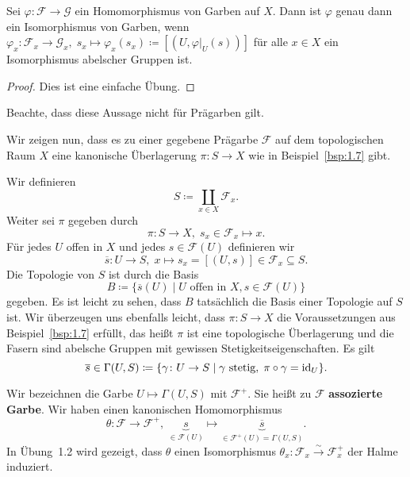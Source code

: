 \begin{prop}
	Sei $\varphi \colon \mathcal{F} \to \mathcal{G}$ ein Homomorphismus von Garben auf $X$. Dann ist $\varphi$ genau dann ein Isomorphismus von Garben, wenn $\varphi_x \colon \mathcal{F}_x \to \mathcal{G}_x,\; s_x \mapsto \varphi_x(s_x) \coloneqq [(U,\varphi\vert_U(s))]$ für alle $x \in X$ ein Isomorphismus abelscher Gruppen ist.
	\begin{proof}
		Dies ist eine einfache Übung.
	\end{proof}
	Beachte, dass diese Aussage nicht für Prägarben gilt.
\end{prop}

\begin{bem}
\label{bem:1.15}
	Wir zeigen nun, dass es zu einer gegebene Prägarbe $\mathcal{F}$ auf dem topologischen Raum $X$ eine kanonische Überlagerung $\pi\colon S \to X$ wie in Beispiel~\ref{bsp:1.7} gibt.

	Wir definieren
	\[
		S\coloneqq \coprod_{x\in X} \mathcal{F}_x.
	\]
	Weiter sei $\pi$ gegeben durch
	\[
		\pi\colon S \to X,\; s_x\in \mathcal{F}_x \mapsto x.
	\]
	Für jedes $U$ offen in $X$ und jedes $s \in \mathcal{F}(U)$ definieren wir
	\[
		\overline{s}\colon U \to S,\; x \mapsto s_x = [(U,s)] \in \mathcal{F}_x \subseteq S.
	\]
	Die Topologie von $S$ ist durch die Basis
	\[
		B \coloneqq \{\overline{s}(U) \mid U \text{ offen in } X, s \in \mathcal{F}(U)\}
	\]
	gegeben. Es ist leicht zu sehen, dass $B$ tatsächlich die Basis einer Topologie auf $S$ ist. Wir überzeugen uns ebenfalls leicht, dass $\pi\colon S \to X$ die Voraussetzungen aus Beispiel~\ref{bsp:1.7} erfüllt, das heißt $\pi$ ist eine topologische Überlagerung und die Fasern sind abelsche Gruppen mit gewissen Stetigkeitseigenschaften. Es gilt
	\[
		\overline{s} \in \Gamma(U,S) \coloneqq \{\gamma\colon U \to S \mid \gamma \text{ stetig},\; \pi \circ \gamma = \operatorname{id}_U\}.
	\]
\end{bem}

\begin{defn}
	Wir bezeichnen die Garbe $U \mapsto \Gamma(U,S)$ mit $\mathcal{F}^+$. Sie heißt zu $\mathcal{F}$ \textbf{assozierte Garbe}. Wir haben einen kanonischen Homomorphismus
	\[
		\theta\colon \mathcal{F} \to \mathcal{F}^+,\; \underbrace{s}_{\in \mathcal{F}(U)} \mapsto \underbrace{\overline{s}}_{\in \mathcal{F}^+(U)=\Gamma(U,S)}.
	\]
	In Übung~1.2 wird gezeigt, dass $\theta$ einen Isomorphismus $\theta_x \colon \mathcal{F}_x \overset{\sim}{\to} \mathcal{F}^+_x$ der Halme induziert.
\end{defn}


